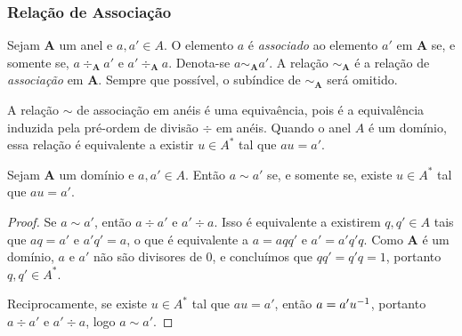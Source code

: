 
\subsubsection{Relação de Associação}

\begin{defi}
Sejam $\bm A$ um anel e $a,a' \in A$. O elemento $a$ é \emph{associado} ao elemento $a'$ em $\bm A$ se, e somente se, $a \div_{\bm A} a'$ e $a' \div_{\bm A} a$. Denota-se $a \sim_{\bm A} a'$. A relação $\sim_{\bm A}$ é a relação de \emph{associação} em $\bm A$. Sempre que possível, o subíndice de $\sim_{\bm A}$ será omitido.
\end{defi}

A relação $\sim$ de associação em anéis é uma equivaência, pois é a equivalência induzida pela pré-ordem de divisão $\div$ em anéis. Quando o anel $A$ é um domínio, essa relação é equivalente a existir $u \in A^*$ tal que $au=a'$.

\begin{prop}
Sejam $\bm A$ um domínio e $a,a' \in A$. Então $a \sim a'$ se, e somente se, existe $u \in A^*$ tal que $au=a'$.
\end{prop}
\begin{proof}
Se $a \sim a'$, então $a \div a'$ e $a' \div a$. Isso é equivalente a existirem $q,q' \in A$ tais que $aq=a'$ e $a'q'=a$, o que é equivalente a $a=aqq'$ e $a'=a'q'q$.
Como $\bm A$ é um domínio, $a$ e $a'$ não são divisores de $0$, e concluímos que $qq'=q'q=1$, portanto $q,q' \in A^*$.

Reciprocamente, se existe $u \in A^*$ tal que $au=a'$, então $a=a'u^{-1}$, portanto $a \div a'$ e $a' \div a$, logo $a \sim a'$.
\end{proof}

